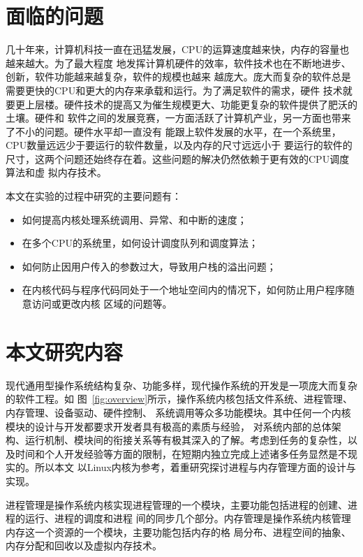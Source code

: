 \documentclass{swfuthesism}
\begin{document}
\section{面临的问题}

几十年来，计算机科技一直在迅猛发展，CPU的运算速度越来快，内存的容量也越来越大。为了最大程度
地发挥计算机硬件的效率，软件技术也在不断地进步、创新，软件功能越来越复杂，软件的规模也越来
越庞大。庞大而复杂的软件总是需要更快的CPU和更大的内存来承载和运行。为了满足软件的需求，硬件
技术就要更上层楼。硬件技术的提高又为催生规模更大、功能更复杂的软件提供了肥沃的土壤。硬件和
软件之间的发展竞赛，一方面活跃了计算机产业，另一方面也带来了不小的问题。硬件水平却一直没有
能跟上软件发展的水平，在一个系统里，CPU数量远远少于要运行的软件数量，以及内存的尺寸远远小于
要运行的软件的尺寸，这两个问题还始终存在着。这些问题的解决仍然依赖于更有效的CPU调度算法和虚
拟内存技术。

本文在实验的过程中研究的主要问题有：
\begin{itemize}
\item 如何提高内核处理系统调用、异常、和中断的速度；
\item 在多个CPU的系统里，如何设计调度队列和调度算法；
\item 如何防止因用户传入的参数过大，导致用户栈的溢出问题；
\item 在内核代码与程序代码同处于一个地址空间内的情况下，如何防止用户程序随意访问或更改内核
  区域的问题等。
\end{itemize}

\section{本文研究内容}

现代通用型操作系统结构复杂、功能多样，现代操作系统的开发是一项庞大而复杂的软件工程。如
图~\ref{fig:overview}所示，操作系统内核包括文件系统、进程管理、内存管理、设备驱动、硬件控制、
系统调用等众多功能模块。其中任何一个内核模块的设计与开发都要求开发者具有极高的素质与经验，
对系统内部的总体架构、运行机制、模块间的衔接关系等有极其深入的了解。考虑到任务的复杂性，以
及时间和个人开发经验等方面的限制，在短期内独立完成上述诸多任务显然是不现实的。所以本文
以Linux内核为参考，着重研究探讨进程与内存管理方面的设计与实现。

进程管理是操作系统内核实现进程管理的一个模块，主要功能包括进程的创建、进程的运行、进程的调度和进程
间的同步几个部分。内存管理是操作系统内核管理内存这一个资源的一个模块，主要功能包括内存的格
局分布、进程空间的抽象、内存分配和回收以及虚拟内存技术。
\end{document}
